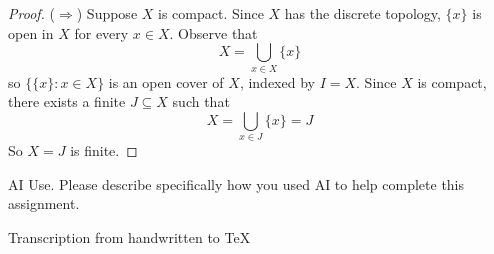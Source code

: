 \documentclass[minion]{homework}
\begin{document}
\begin{problems}
\begin{proof}
  ($\Rightarrow$) Suppose $X$ is compact. Since $X$ has the discrete topology, $\{x\}$ is open in $X$ for every $x \in X$. Observe that
  $$X = \bigcup_{x \in X} \{x\}$$
  so $\{\{x\} : x \in X\}$ is an open cover of $X$, indexed by $I = X$. Since $X$ is compact, there exists a finite $J \subseteq X$ such that
  $$X = \bigcup_{x \in J} \{x\} = J$$
  So $X = J$ is finite.
\end{proof}

\problem AI Use. Please describe specifically how you used AI to help complete this assignment.

Transcription from handwritten to TeX

\end{problems}
\end{document}
